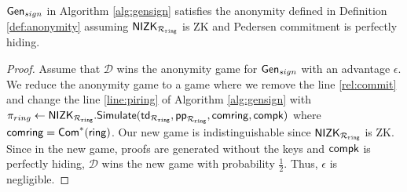 %	
%	


\begin{lemma} \label{lem:anonymity} $ \mathsf{Gen}_{sign}$ in Algorithm \ref{alg:gensign} satisfies the anonymity defined in Definition \ref{def:anonymity} assuming  $ {\mathsf{NIZK}}_{\mathcal{R}_{\mathtt{ring}}} $ is ZK and Pedersen commitment is perfectly hiding.
\end{lemma}

\begin{proof} Assume that $ \mathcal{D} $ wins the anonymity game for $ \mathsf{Gen}_{sign} $ with an advantage $ \epsilon $.
We reduce the anonymity game to a game where we remove the line \ref{rel:commit} and change the line \ref{line:piring} of Algorithm \ref{alg:gensign} with $ \pi_{ring} \leftarrow {\ensuremath{\mathsf{NIZK}}}_{\mathcal{R}_{\mathtt{ring}}}.\mathsf{Simulate}(\mathsf{td}_{\mathcal{R}_{\mathtt{ring}}}, \mathsf{pp}_{\mathcal{R}_{\mathtt{ring}}},\mathsf{comring}, \mathsf{compk}) $ where $ \mathsf{comring} = \mathsf{Com}^*(\mathsf{ring}) $.  Our new game is indistinguishable since $ {\mathsf{NIZK}}_{\mathcal{R}_{\mathtt{ring}}} $ is ZK.  Since in the new game, proofs are generated without the keys and $ \mathsf{compk} $ is perfectly hiding,   $ \mathcal{D} $ wins the new game with probability $ \frac{1}{2} $. Thus, $ \epsilon $ is negligible.		
\end{proof}



